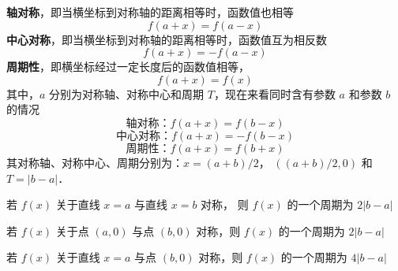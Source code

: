 
\textbf{轴对称}，即当横坐标到对称轴的距离相等时，函数值也相等
\begin{equation}
f\left( {a + x} \right) = f\left( {a - x} \right)
\end{equation}
\textbf{中心对称}，即当横坐标到对称轴的距离相等时，函数值互为相反数
\begin{equation}
f\left( {a + x} \right) =  - f\left( {a - x} \right)
\end{equation}
\textbf{周期性}，即横坐标经过一定长度后的函数值相等，
\begin{equation}
f\left( {a + x} \right) = f\left( x \right)
\end{equation}
其中，$a$ 分别为对称轴、对称中心和周期 $T$，现在来看同时含有参数 $a$ 和参数 $b$ 的情况
\begin{equation}
\text{轴对称：} f\left( {a + x} \right) = f\left( {b - x} \right)
\end{equation}
\begin{equation}
\text{中心对称：} f\left( {a + x} \right) =  - f\left( {b - x} \right)
\end{equation}
\begin{equation}
\text{周期性：} f\left( {a + x} \right) = f\left( {b + x} \right)
\end{equation}
其对称轴、对称中心、周期分别为：$x = (a + b)/2$， $((a + b)/2, 0)$ 和 $T = \left| {b - a} \right|$．

若 $f(x)$ 关于直线 $x=a$ 与直线 $x=b$ 对称， 则 $f(x)$ 的一个周期为 $2\left| {b - a} \right|$

若 $f(x)$ 关于点 $(a,0)$ 与点 $(b,0)$ 对称，则 $f(x)$ 的一个周期为 $2\left| {b - a} \right|$

若 $f(x)$ 关于直线 $x=a$ 与点 $(b,0)$ 对称，则 $f(x)$ 的一个周期为 $4\left| {b - a} \right|$
